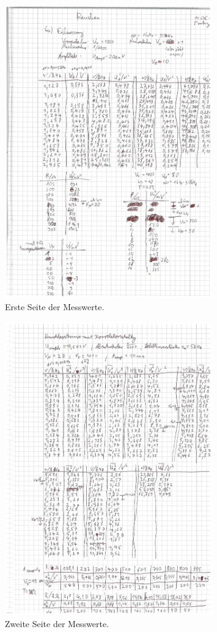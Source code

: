 \begin{figure}
  \centering
  \includegraphics[width=0.8\textwidth]{messwerte/1.pdf}
  \caption{Erste Seite der Messwerte.}
  \label{fig:messwert1}
\end{figure}
\begin{figure}
  \centering
  \includegraphics[width=0.8\textwidth]{messwerte/2.pdf}
  \caption{Zweite Seite der Messwerte.}
  \label{fig:messwert2}
\end{figure}
